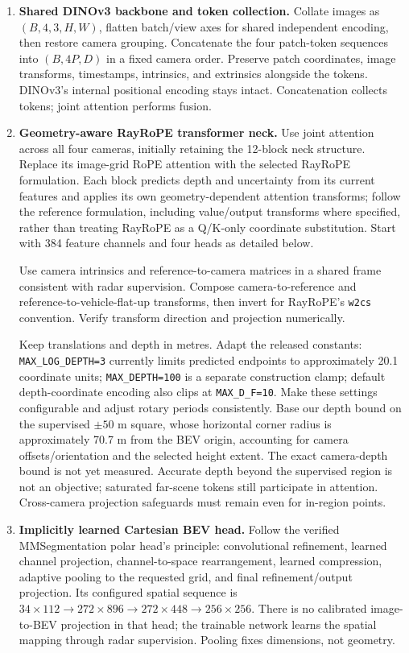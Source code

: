 \documentclass[11pt,a4paper]{article}
\begin{document}
\begin{enumerate}
\item \textbf{Shared DINOv3 backbone and token collection.}
Collate images as $(B,4,3,H,W)$, flatten batch/view axes for shared independent encoding, then restore camera grouping. Concatenate the four patch-token sequences into $(B,4P,D)$ in a fixed camera order. Preserve patch coordinates, image transforms, timestamps, intrinsics, and extrinsics alongside the tokens. DINOv3's internal positional encoding stays intact. Concatenation collects tokens; joint attention performs fusion.

\item \textbf{Geometry-aware RayRoPE transformer neck.}
Use joint attention across all four cameras, initially retaining the 12-block neck structure. Replace its image-grid RoPE attention with the selected RayRoPE formulation. Each block predicts depth and uncertainty from its current features and applies its own geometry-dependent attention transforms; follow the reference formulation, including value/output transforms where specified, rather than treating RayRoPE as a Q/K-only coordinate substitution. Start with 384 feature channels and four heads as detailed below.

Use camera intrinsics and reference-to-camera matrices in a shared frame consistent with radar supervision. Compose camera-to-reference and reference-to-vehicle-flat-up transforms, then invert for RayRoPE's \texttt{w2cs} convention. Verify transform direction and projection numerically.

Keep translations and depth in metres. Adapt the released constants: \texttt{MAX\_LOG\_DEPTH=3} currently limits predicted endpoints to approximately 20.1 coordinate units; \texttt{MAX\_DEPTH=100} is a separate construction clamp; default depth-coordinate encoding also clips at \texttt{MAX\_D\_F=10}. Make these settings configurable and adjust rotary periods consistently. Base our depth bound on the supervised $\pm50$ m square, whose horizontal corner radius is approximately 70.7 m from the BEV origin, accounting for camera offsets/orientation and the selected height extent. The exact camera-depth bound is not yet measured. Accurate depth beyond the supervised region is not an objective; saturated far-scene tokens still participate in attention. Cross-camera projection safeguards must remain even for in-region points.

\item \textbf{Implicitly learned Cartesian BEV head.}
Follow the verified MMSegmentation polar head's principle: convolutional refinement, learned channel projection, channel-to-space rearrangement, learned compression, adaptive pooling to the requested grid, and final refinement/output projection. Its configured spatial sequence is $34\times112 \rightarrow272\times896 \rightarrow272\times448 \rightarrow256\times256$. There is no calibrated image-to-BEV projection in that head; the trainable network learns the spatial mapping through radar supervision. Pooling fixes dimensions, not geometry.


\end{enumerate}
\end{document}
